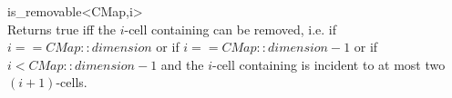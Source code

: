 \ccRefPageBegin

\begin{ccRefFunction}{is_removable<CMap,i>}
\\
         {Returns true iff the $i$-cell containing  can be removed,
          i.e. if $i==CMap::dimension$ or if 
          $i==CMap::dimension-1$ or 
          if $i<CMap::dimension-1$ and the $i$-cell containing  
          is incident to at most two $(i+1)$-cells.
}

\ccSeeAlso
{}\\
\end{ccRefFunction}
